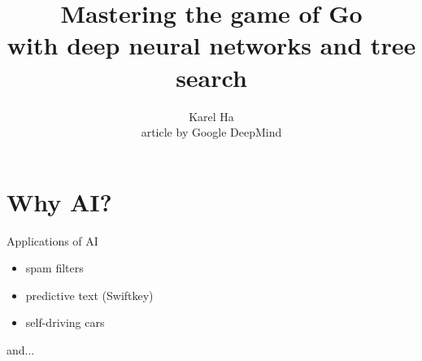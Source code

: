 \documentclass{beamer}
\title{Mastering the game of Go \\ with deep neural networks and tree search}
\date{}                         %
\author{Karel Ha \\ article by Google DeepMind}
\institute{Spring School of Combinatorics 2016}
\begin{document}
  {
    \maketitle
  }


  \section{Why AI?}

  \begin{frame}{Applications of AI}
    \begin{itemize}[<+- | alert@+>]
      \item spam filters
      \item predictive text (Swiftkey)
      \item self-driving cars
    \end{itemize}
    \pause

    and...
  \end{frame}
\end{document}
